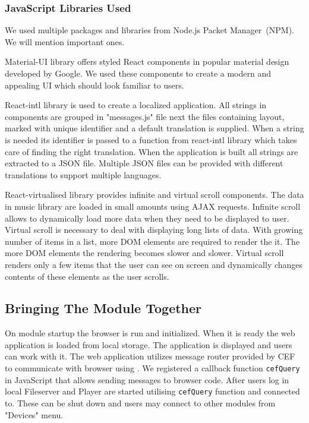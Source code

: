 \subsubsection{JavaScript Libraries Used}

We used multiple packages and libraries from Node.js Packet Manager~(NPM). We will mention important ones.
\par
Material-UI library offers styled React components in popular material design developed by Google. We used these components to create a modern and appealing UI which should look familiar to users.
\par
React-intl library is used to create a localized application. All strings in components are grouped in "messages.js" file next the files containing layout, marked with unique identifier and a default translation is supplied. When a string is needed its identifier is passed to a function from react-intl library which takes care of finding the right translation. When the application is built all strings are extracted to a JSON file. Multiple JSON files can be provided with different translations to support multiple languages.
\par
React-virtualised library provides infinite and virtual scroll components. The data in music library are loaded in small amounts using AJAX requests. Infinite scroll allows to dynamically load more data when they need to be displayed to user. Virtual scroll is necessary to deal with displaying long lists of data. With growing number of items in a list, more DOM elements are required to render the it. The more DOM elements the rendering becomes slower and slower. Virtual scroll renders only a few items that the user can see on screen and dynamically changes contents of these elements as the user scrolls.

\subsection{Bringing The Module Together}

On module startup the browser is run and initialized. When it is ready the web application is loaded from local storage. The application is displayed and users can work with it. The web application utilizes message router provided by CEF to communicate with browser using . We registered a callback function \texttt{cefQuery} in JavaScript that allows sending messages to browser code. After users log in local Fileserver and Player are started utilising \texttt{cefQuery} function and connected to. These can be shut down and users may connect to other modules from "Devices" menu. 

